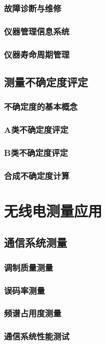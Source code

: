 \documentclass[12pt,UTF8]{ctexbook}
\begin{document}
\section{故障诊断与维修}
\section{仪器管理信息系统}
\section{仪器寿命周期管理}

\chapter{测量不确定度评定}
\section{不确定度的基本概念}
\section{A类不确定度评定}
\section{B类不确定度评定}
\section{合成不确定度计算}

\part{无线电测量应用}

\chapter{通信系统测量}
\section{调制质量测量}
\section{误码率测量}
\section{频谱占用度测量}
\section{通信系统性能测试}
\end{document}
